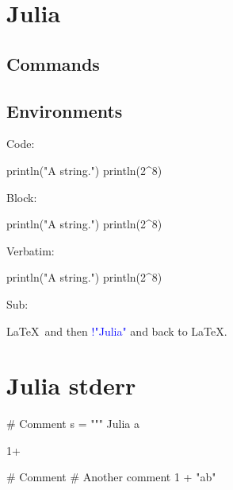 \documentclass[11pt]{article}
\begin{document}
\section*{Julia}

\subsection*{Commands}




\printpythontex




\subsection*{Environments}

Code:
\begin{juliacode}
println("A string.")
println(2^8)
\end{juliacode}

Block:
\begin{juliablock}
println("A string.")
println(2^8)
\end{juliablock}

\printpythontex

Verbatim:
\begin{juliaverbatim}
println("A string.")
println(2^8)
\end{juliaverbatim}

Sub:
\begin{juliasub}
\LaTeX\ and then \textcolor{blue}{!{"Julia"}} and back to \LaTeX.
\end{juliasub}


\section*{Julia stderr}


\begin{juliablock}[err1][numbers=left]
# Comment
s = """
    Julia a
\end{juliablock}

\stderrpythontex

\begin{juliablock}[err2][numbers=left]
1+
\end{juliablock}

\stderrpythontex

\begin{juliablock}[err3][numbers=left]
# Comment
# Another comment
1 + "ab"
\end{juliablock}

\stderrpythontex
\end{document}
